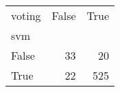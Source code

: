 \begin{tabular}{lrr}
\toprule
voting &  False &  True  \\
svm   &        &        \\
\midrule
False &     33 &     20 \\
True  &     22 &    525 \\
\bottomrule
\end{tabular}
